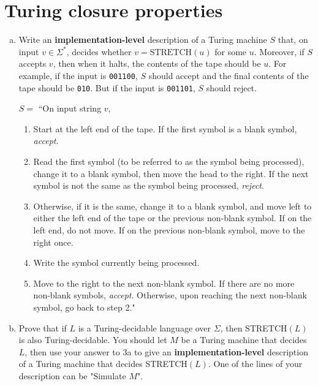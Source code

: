 \documentclass{article}
\begin{document}
    \section{Turing closure properties}

    \begin{enumerate}[(a)]
        \item Write an \textbf{implementation-level} description of a Turing machine $S$ that, on input $v \in \Sigma^*$, decides whether $v = \text{STRETCH}(u)$ for some $u$. Moreover, if $S$ accepts $v$, then when it halts, the contents of the tape should be $u$. For example, if the input is \texttt{001100}, $S$ should accept and the final contents of the tape should be \texttt{010}. But if the input is \texttt{001101}, $S$ should reject.

            $S = $ ``On input string $v$,

            \begin{enumerate}[1.]
                \item Start at the left end of the tape. If the first symbol is a blank symbol, \textit{accept}.

                \item Read the first symbol (to be referred to as the symbol being processed), change it to a blank symbol, then move the head to the right. If the next symbol is not the same as the symbol being processed, \textit{reject}.

                \item Otherwise, if it is the same, change it to a blank symbol, and move left to either the left end of the tape or the previous non-blank symbol. If on the left end, do not move. If on the previous non-blank symbol, move to the right once.

                \item Write the symbol currently being processed.

                \item Move to the right to the next non-blank symbol. If there are no more non-blank symbols, \textit{accept}. Otherwise, upon reaching the next non-blank symbol, go back to step 2."
            \end{enumerate}

        \item Prove that if $L$ is a Turing-decidable language over $\Sigma$, then STRETCH$(L)$ is also Turing-decidable. You should let $M$ be a Turing machine that decides $L$, then use your answer to 3a to give an \textbf{implementation-level} description of a Turing machine that decides STRETCH$(L)$. One of the lines of your description can be "Simulate $M$".


\end{enumerate}
\end{document}

